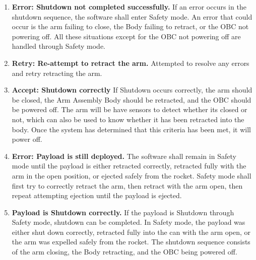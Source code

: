 \begin{center}
\begin{enumerate}
\item{\textbf{Error: Shutdown not completed successfully.} If an error occurs in the shutdown sequence, the software shall enter Safety mode. An error that could occur is the arm failing to close, the Body failing to retract, or the \gls{OBC} not powering off. All 
these situations except for the \gls{OBC} not powering off are handled through Safety mode.}
\item{\textbf{Retry: Re-attempt to retract the arm.} Attempted to resolve any errors and retry retracting the arm.}
\item{\textbf{Accept: Shutdown correctly} If Shutdown occurs correctly, the arm should be closed, the Arm Assembly Body should be retracted, and the \gls{OBC} should be powered off. The arm will be have sensors to detect whether its closed or not, which can also
be used to know whether it has been retracted into the body. Once the system has determined that this criteria has been met, it
will power off.}
\item{\textbf{Error: Payload is still deployed.} The software shall remain in Safety mode until the payload is either retracted correctly, retracted fully with the arm in the open position, or ejected safely from the rocket. Safety mode shall first try to correctly retract the arm, then retract with the arm open, then repeat attempting ejection until the payload is ejected.}
\item{\textbf{Payload is Shutdown correctly.} If the payload is Shutdown through Safety mode, shutdown can be completed. In Safety mode, the payload was either shut down correctly, retracted fully into the can with the arm open, or the arm was expelled safely from the rocket. The shutdown sequence consists of the arm closing, the Body retracting, and the \gls{OBC} being powered off.}
\end{enumerate}
\end{center}

